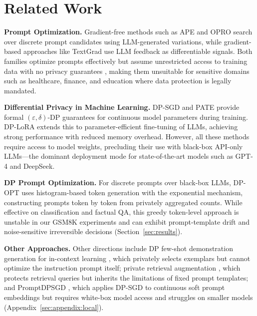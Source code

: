 \section{Related Work}
\label{sec:related}

\noindent\textbf{Prompt Optimization.}
Gradient-free methods such as APE \cite{zhou2023large} and OPRO \cite{yang2023large} search over discrete prompt candidates using LLM-generated variations, while gradient-based approaches like TextGrad \cite{yuksekgonul2024textgrad} use LLM feedback as differentiable signals. Both families optimize prompts effectively but assume unrestricted access to training data with no privacy guarantees \cite{edemacu2024privacy}, making them unsuitable for sensitive domains such as healthcare, finance, and education where data protection is legally mandated.

\noindent\textbf{Differential Privacy in Machine Learning.}
DP-SGD \cite{abadi2016deep} and PATE \cite{papernot2018scalable} provide formal $(\varepsilon,\delta)$-DP guarantees for continuous model parameters during training. DP-LoRA \cite{liu2024differentially,frery2025private} extends this to parameter-efficient fine-tuning of LLMs, achieving strong performance with reduced memory overhead. However, all these methods require access to model weights, precluding their use with black-box API-only LLMs---the dominant deployment mode for state-of-the-art models such as GPT-4 and DeepSeek.

\noindent\textbf{DP Prompt Optimization.}
For discrete prompts over black-box LLMs, DP-OPT \cite{hong2024dpopt} uses histogram-based token generation with the exponential mechanism, constructing prompts token by token from privately aggregated counts. While effective on classification and factual QA, this greedy token-level approach is unstable in our GSM8K experiments and can exhibit prompt-template drift and noise-sensitive irreversible decisions (Section~\ref{sec:results}).

\noindent\textbf{Other Approaches.}
Other directions include DP few-shot demonstration generation for in-context learning \cite{tang2024privacy}, which privately selects exemplars but cannot optimize the instruction prompt itself; private retrieval augmentation \cite{koskela2025differentially}, which protects retrieval queries but inherits the limitations of fixed prompt templates; and PromptDPSGD \cite{Duan2023FlocksOS}, which applies DP-SGD to continuous soft prompt embeddings but requires white-box model access and struggles on smaller models (Appendix~\ref{sec:appendix:local}).

